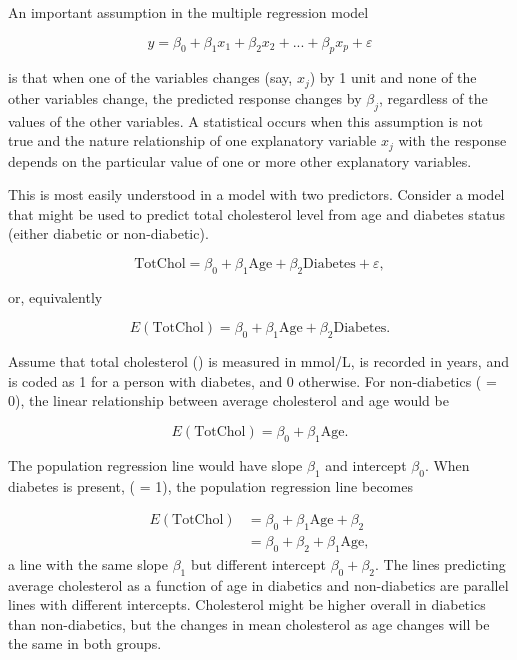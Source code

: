 An important assumption in the multiple regression model

\[y = \beta_0 + \beta_1x_1 + \beta_2x_2 + ... + \beta_px_p + \varepsilon \] 

is that when one of the variables changes (say, $x_j$) by 1 unit and none of the other variables change, the predicted response changes by $\beta_j$, regardless of the values of the other variables.  A statistical  occurs when this assumption is not true and the nature relationship of one explanatory variable $x_j$ with the response depends on the particular value of one or more other explanatory variables.

This is most easily understood in a model with two predictors.  Consider a model that might be used to predict total cholesterol level from age and diabetes status (either diabetic or non-diabetic).  

\[\text{TotChol} = \beta_0 + \beta_1\text{Age} + \beta_2\text{Diabetes} + \varepsilon, \]

or, equivalently

\[E(\text{TotChol}) = \beta_0 + \beta_1\text{Age} + \beta_2\text{Diabetes}. \]

Assume that total cholesterol () is measured in mmol/L,  is recorded in years, and  is coded as 1 for a person with diabetes, and 0 otherwise.  For non-diabetics ( = 0), the linear relationship between average cholesterol and age would be

\[E(\text{TotChol}) = \beta_0 + \beta_1\text{Age}. \]

The population regression line would have slope $\beta_1$ and intercept $\beta_0$.  When diabetes is present, ( = 1), the population regression line becomes

\begin{align*}
E(\text{TotChol}) &= \beta_0 + \beta_1\text{Age} + \beta_2  \\
&= \beta_0 + \beta_2 + \beta_1\text{Age},
\end{align*}
a line with the same slope $\beta_1$ but different intercept $\beta_0 + \beta_2$.  The lines predicting average cholesterol as a function of age in diabetics and non-diabetics are parallel lines with different intercepts.  Cholesterol might be higher overall in diabetics than non-diabetics, but the changes in mean cholesterol as age changes will be the same in both groups.

